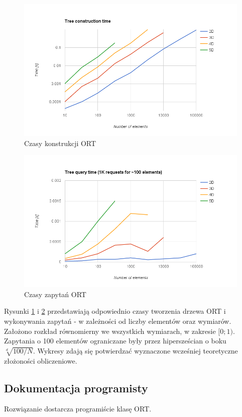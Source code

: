 \documentclass[a4paper]{article}
\begin{document}
\begin{figure}[H]
\centering
\includegraphics[scale=0.4]{Images/constr.png}
\caption{Czasy konstrukcji ORT}\label{fig:constr}
\end{figure}

\begin{figure}[H]
\centering
\includegraphics[scale=0.4]{Images/query.png}
\caption{Czasy zapytań ORT}\label{fig:query}
\end{figure}

Rysunki \ref{fig:constr} i \ref{fig:query} przedstawiają odpowiednio czasy tworzenia drzewa ORT i wykonywania zapytań - w zależności od liczby elementów oraz wymiarów. Założono rozkład równomierny we wszystkich wymiarach, w zakresie $[0;1)$. Zapytania o 100 elementów ograniczane były przez hipersześcian o boku $\sqrt[d]{100/N}$. Wykresy zdają się potwierdzać wyznaczone wcześniej teoretyczne złożoności obliczeniowe.

\subsection{Dokumentacja programisty}
Rozwiązanie dostarcza programiście klasę ORT.
\end{document}

